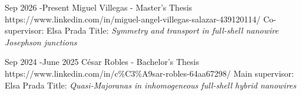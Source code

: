 \job
{Sep 2026 -}{Present}
{Miguel Villegas - Master's Thesis}
{https://www.linkedin.com/in/miguel-angel-villegas-salazar-439120114/}
{Co-supervisor: Elsa Prada}
{Title: \textit{Symmetry and transport in full-shell nanowire Josephson junctions}}

\job
{Sep 2024 -}{June 2025}
{César Robles - Bachelor's Thesis}
{https://www.linkedin.com/in/c\%C3\%A9sar-robles-64aa67298/}
{Main supervisor: Elsa Prada}
{Title: \textit{Quasi-Majoranas in inhomogeneous full-shell hybrid nanowires}}

